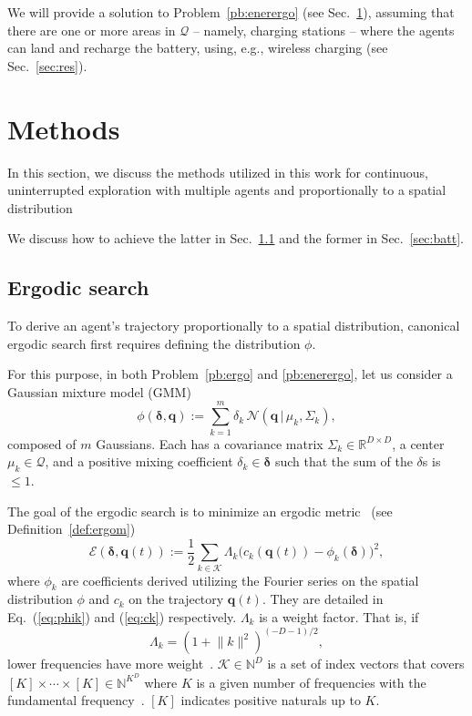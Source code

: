 \documentclass[letterpaper,10pt,conference,twoside]{IEEEtran}
\theoremstyle{definition}
\begin{document}
We will provide a solution to Problem~\ref{pb:enerergo} (see Sec.~\ref{sec:meth}), assuming that there are one or more areas in $\mathcal{Q}$ -- namely, charging stations -- where the agents can land and recharge the battery, using, e.g., wireless charging (see Sec.~\ref{sec:res}). 


\section{Methods}\label{sec:meth}
\noindent
In this section, we discuss the methods utilized in this work for continuous, uninterrupted exploration with multiple agents and proportionally to a spatial distribution

We discuss how to achieve the latter in Sec.~\ref{sec:ergosearch} and the former in Sec.~\ref{sec:batt}.

\subsection{Ergodic search}\label{sec:ergosearch}
\noindent
To derive an agent's trajectory proportionally to a spatial distribution, canonical ergodic search first requires defining the distribution $\phi$.

For this purpose, in both Problem~\ref{pb:ergo} and \ref{pb:enerergo}, let us consider a Gaussian mixture model (GMM)
\begin{equation}\label{eq:gmm}
  \phi(\boldsymbol{\delta},\mathbf{q}):=\sum_{k=1}^{m}\delta_k\,\mathcal{N}(\mathbf{q}\,|\,\mu_k,\Sigma_k),
\end{equation} 
composed of $m$ Gaussians. Each has a covariance matrix ${\Sigma_k}\in\mathbb{R}^{D\times D}$, a center $\mu_k\in\mathcal{Q}$, and a positive mixing coefficient $\delta_k\in\boldsymbol{\delta}$ such that the sum of the $\delta$s is $\leq 1$. %

The goal of the ergodic search is to minimize an ergodic metric~\cite{mathew2011metrics} (see Definition~\ref{def:ergom})
\begin{equation}\label{eq:ergmetric}
  \mathcal{E}(\boldsymbol{\delta},\mathbf{q}(t)):=\frac{1}{2}\sum_{k\in\mathcal{K}}\Lambda_k \big( c_k(\mathbf{q}(t))-\phi_k(\boldsymbol{\delta}) \big)^2,
\end{equation}
where $\phi_k$ are coefficients derived utilizing the Fourier series on the spatial distribution $\phi$ and $c_k$ on the trajectory $\mathbf{q}(t)$. They are detailed in Eq.~(\ref{eq:phik}) and (\ref{eq:ck}) respectively.
$\Lambda_k$ is a weight factor. That is, if 
\begin{equation}
  \Lambda_k=(1+\lVert k\rVert^2)^{(-D-1)/2},
\end{equation}
lower frequencies have more weight~\cite{miller2016ergodic}.
$\mathcal{K}\in\mathbb{N}^D$ is a set of index vectors that covers $[K]\times\cdots\times[K]\in\mathbb{N}^{K^D}$ 
where $K$ is a given number of frequencies with the fundamental frequency~\cite{calinon2020mixture}. %
 $[K]$ indicates positive naturals up to $K$.
\end{document}
